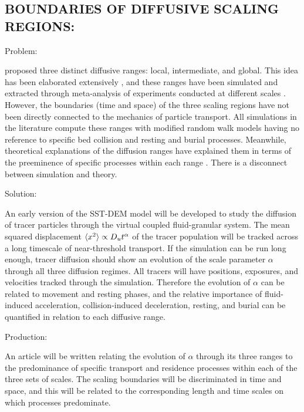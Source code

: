 \subsection{BOUNDARIES OF DIFFUSIVE SCALING REGIONS:}

Problem: 

\cite{Nikora2001a} proposed three distinct diffusive ranges: local, intermediate, and global. This idea has been elaborated extensively \citep{Hassan2015,Furbish2017}, and these ranges have been simulated \citep{Martin2012, Zhang2012, Bialik2015, Fan2016} and extracted through meta-analysis of experiments conducted at different scales \citep{Zhang2012}. However, the boundaries (time and space) of the three scaling regions have not been directly connected to the mechanics of particle transport. All simulations in the literature compute these ranges with modified random walk models having no reference to specific bed collision and resting and burial processes. Meanwhile, theoretical explanations of the diffusion ranges have explained them in terms of the preeminence of specific processes within each range \citep{Hassan2015,Furbish2017}. There is a disconnect between simulation and theory.  
\bigskip 

Solution: 

An early version of the SST-DEM model will be developed to study the diffusion of tracer particles through the virtual coupled fluid-granular system. The mean squared displacement $\langle x^2 \rangle \propto D_u t^\alpha$ of the tracer population will be tracked across a long timescale of near-threshold transport. If the simulation can be run long enough, tracer diffusion should show an evolution of the scale parameter $\alpha$ through all three diffusion regimes. All tracers will have positions, exposures, and velocities tracked through the simulation. Therefore the evolution of $\alpha$ can be related to movement and resting phases, and the relative importance of fluid-induced acceleration, collision-induced deceleration, resting, and burial can be quantified in relation to each diffusive range. 
 
\bigskip 

Production: 

An article will be written relating the evolution of $\alpha$ through its three ranges to the predominance of specific transport and residence processes within each of the three sets of scales. The scaling boundaries will be discriminated in time and space, and this will be related to the corresponding length and time scales on which processes predominate. 
\bigskip 




